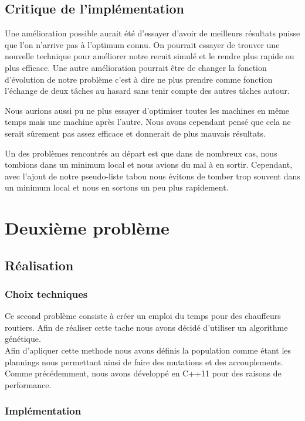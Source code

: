\documentclass{report}
\begin{document}
\section{Critique de l'implémentation}
Une amélioration possible aurait été d'essayer d'avoir de meilleurs résultats puisse que l'on n'arrive pas à l'optimum connu. On pourrait essayer de trouver une nouvelle technique pour améliorer notre recuit simulé et le rendre plus rapide ou plus efficace. Une autre amélioration pourrait être de changer la fonction d'évolution de notre problème c'est à dire ne plus prendre comme fonction l'échange de deux tâches au hasard sans tenir compte des autres tâches autour.

Nous aurions aussi pu ne plus essayer d'optimiser toutes les machines en même temps mais une machine après l'autre. Nous
avons cependant pensé que cela ne serait sûrement pas assez efficace et donnerait de plus mauvais résultats.

Un des problèmes rencontrés au départ est que dans de nombreux cas, nous tombions dans un minimum local et nous avions
du mal à en sortir. Cependant, avec l'ajout de notre pseudo-liste tabou nous évitons de tomber trop souvent dans un
minimum local et nous en sortons un peu plus rapidement.

\newpage

\chapter{Deuxième problème}
\minitoc
\section{Réalisation}
\subsection{Choix techniques}
Ce second problème consiste à créer un emploi du temps pour des chauffeurs routiers. Afin de réaliser cette tache nous avons décidé
d'utiliser un algorithme génétique.\\
Afin d'apliquer cette methode nous avons définis la population comme étant les plannings nous permettant ainsi de faire des mutations et
des accouplements. Comme précédemment, nous avons développé en C++11 pour des raisons de performance.

\subsection{Implémentation}
\end{document}
